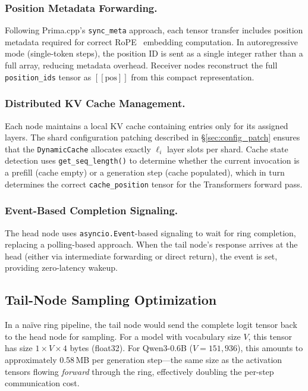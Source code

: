 \documentclass[runningheads]{llncs}
\begin{document}
\subsubsection{Position Metadata Forwarding.}
Following Prima.cpp's \texttt{sync\_meta} approach, each tensor transfer includes position metadata required for correct RoPE~\cite{su2024roformer} embedding computation. In autoregressive mode (single-token steps), the position ID is sent as a single integer rather than a full array, reducing metadata overhead. Receiver nodes reconstruct the full \texttt{position\_ids} tensor as $[[\text{pos}]]$ from this compact representation.

\subsubsection{Distributed KV Cache Management.}
Each node maintains a local KV cache containing entries only for its assigned layers. The shard configuration patching described in \S\ref{sec:config_patch} ensures that the \texttt{DynamicCache} allocates exactly $\ell_i$ layer slots per shard. Cache state detection uses \texttt{get\_seq\_length()} to determine whether the current invocation is a prefill (cache empty) or a generation step (cache populated), which in turn determines the correct \texttt{cache\_position} tensor for the Transformers forward pass.

\subsubsection{Event-Based Completion Signaling.}
The head node uses \texttt{asyncio.Event}-based signaling to wait for ring completion, replacing a polling-based approach. When the tail node's response arrives at the head (either via intermediate forwarding or direct return), the event is set, providing zero-latency wakeup.

\subsection{Tail-Node Sampling Optimization}
\label{sec:tail_sampling}

In a na\"ive ring pipeline, the tail node would send the complete logit tensor back to the head node for sampling. For a model with vocabulary size $V$, this tensor has size $1 \times V \times 4$ bytes (float32). For Qwen3-0.6B ($V = 151{,}936$), this amounts to approximately 0.58\,MB per generation step---the same size as the activation tensors flowing \emph{forward} through the ring, effectively doubling the per-step communication cost.
\end{document}
